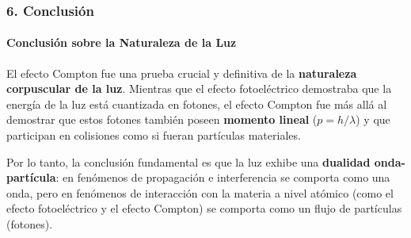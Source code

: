 \subsubsection*{6. Conclusión}
\begin{cajaconclusion} 
\paragraph{Conclusión sobre la Naturaleza de la Luz}
El efecto Compton fue una prueba crucial y definitiva de la \textbf{naturaleza corpuscular de la luz}. Mientras que el efecto fotoeléctrico demostraba que la energía de la luz está cuantizada en fotones, el efecto Compton fue más allá al demostrar que estos fotones también poseen \textbf{momento lineal} ($p=h/\lambda$) y que participan en colisiones como si fueran partículas materiales.

Por lo tanto, la conclusión fundamental es que la luz exhibe una \textbf{dualidad onda-partícula}: en fenómenos de propagación e interferencia se comporta como una onda, pero en fenómenos de interacción con la materia a nivel atómico (como el efecto fotoeléctrico y el efecto Compton) se comporta como un flujo de partículas (fotones).
\end{cajaconclusion} 